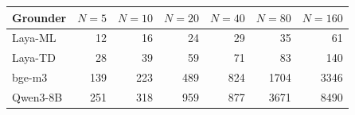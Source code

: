 \begin{tabular}{lrrrrrr}
\toprule
Grounder & $N{=}5$ & $N{=}10$ & $N{=}20$ & $N{=}40$ & $N{=}80$ & $N{=}160$ \\
\midrule
Laya-ML & 12 & 16 & 24 & 29 & 35 & 61 \\
Laya-TD & 28 & 39 & 59 & 71 & 83 & 140 \\
bge-m3 & 139 & 223 & 489 & 824 & 1704 & 3346 \\
Qwen3-8B & 251 & 318 & 959 & 877 & 3671 & 8490 \\
\bottomrule
\end{tabular}
